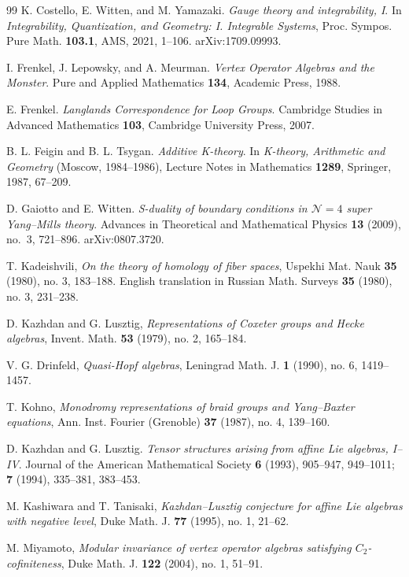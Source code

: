 \begin{thebibliography}{99}
K. Costello, E. Witten, and M. Yamazaki.
\textit{Gauge theory and integrability, I}.
In \textit{Integrability, Quantization, and Geometry: I. Integrable Systems},
Proc. Sympos. Pure Math. \textbf{103.1}, AMS, 2021, 1--106.
arXiv:1709.09993.

I. Frenkel, J. Lepowsky, and A. Meurman.
\textit{Vertex Operator Algebras and the Monster}.
Pure and Applied Mathematics \textbf{134},
Academic Press, 1988.

E. Frenkel.
\textit{Langlands Correspondence for Loop Groups}.
Cambridge Studies in Advanced Mathematics \textbf{103},
Cambridge University Press, 2007.

B. L. Feigin and B. L. Tsygan.
\textit{Additive K-theory}.
In \textit{K-theory, Arithmetic and Geometry} (Moscow, 1984--1986),
Lecture Notes in Mathematics \textbf{1289}, Springer, 1987, 67--209.

D. Gaiotto and E. Witten.
\textit{S-duality of boundary conditions in $\mathcal{N}=4$ super Yang--Mills theory}.
Advances in Theoretical and Mathematical Physics \textbf{13} (2009), no.~3, 721--896.
arXiv:0807.3720.

 T. Kadeishvili, \emph{On the theory of homology of fiber spaces}, Uspekhi Mat. Nauk \textbf{35} (1980), no. 3, 183--188. English translation in Russian Math. Surveys \textbf{35} (1980), no. 3, 231--238.

 D. Kazhdan and G. Lusztig, \emph{Representations of Coxeter groups and Hecke algebras}, Invent. Math. \textbf{53} (1979), no. 2, 165--184.

V. G. Drinfeld, \emph{Quasi-Hopf algebras},
Leningrad Math. J. \textbf{1} (1990), no. 6, 1419--1457.

T. Kohno, \emph{Monodromy representations of braid groups and Yang--Baxter equations},
Ann. Inst. Fourier (Grenoble) \textbf{37} (1987), no. 4, 139--160.

D. Kazhdan and G. Lusztig.
\textit{Tensor structures arising from affine Lie algebras, I--IV}.
Journal of the American Mathematical Society \textbf{6} (1993), 905--947, 949--1011;
\textbf{7} (1994), 335--381, 383--453.

 M. Kashiwara and T. Tanisaki, \emph{Kazhdan--Lusztig conjecture for affine Lie algebras with negative level}, Duke Math. J. \textbf{77} (1995), no. 1, 21--62.

M. Miyamoto, \emph{Modular invariance of vertex operator algebras satisfying $C_2$-cofiniteness}, Duke Math. J. \textbf{122} (2004), no. 1, 51--91.


\end{thebibliography}
